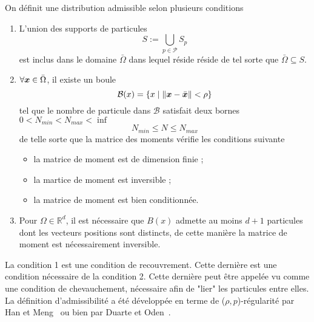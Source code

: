 \begin{definition}
    On définit une distribution admissible selon plusieurs conditions
    \begin{enumerate}
        \item L'union des supports de particules
              \begin{equation*}
                  S:= \bigcup_{p \in \mathcal P} S_p
              \end{equation*}
              est inclus dans le domaine $\bar \Omega$ dans lequel réside réside de tel sorte que $\bar \Omega	\subseteq S$.
        \item $\forall \bm{x} \in \bar \Omega$, il existe un boule %
              \begin{equation}
                  \mathcal B(x) = \{x \mid \|\bm{x} - \bar {\bm{x}}\| < \rho\}
              \end{equation}tel que le nombre de particule dans $\mathcal B$ satisfait deux bornes $0 < N_{min} < N_{max} < \inf$
              \begin{equation*}
                  N_{min} \leq N \leq N_{max}
              \end{equation*} de telle sorte que la matrice des moments vérifie les conditions suivante
              \begin{itemize}
                  \item la matrice de moment est de dimension finie ;
                  \item la martice de moment est inversible ;
                  \item la matrice de moment est bien conditionnée.
              \end{itemize}
        \item Pour $\Omega \in \mathbb R^d$, il est nécessaire que $B(x)$ admette au moins $d+1$ particules dont les vecteurs positions sont distincts, de cette manière la matrice de moment est nécessairement inversible.
    \end{enumerate}
\end{definition}

La condition 1 est une condition de recouvrement. Cette dernière est une condition nécessaire de la condition 2. Cette dernière peut être appelée vu comme une condition de chevauchement, nécessaire afin de "lier" les particules entre elles. La définition d'admissibilité a été développée en terme de ($\rho, p$)-régularité par Han et Meng~\cite{HAN20016157} ou bien par Duarte et Oden~\cite{duarte1996hp}.


